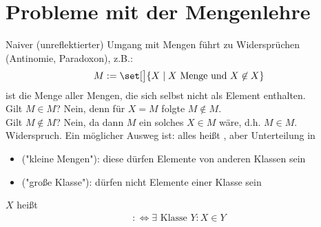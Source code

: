 \section{Probleme mit der Mengenlehre}\label{section:0.3}
Naiver (unreflektierter) Umgang mit Mengen führt zu Widersprüchen (Antinomie, Paradoxon), z.B.:
\begin{align*}
	M:=\set[\big]{X\mid X\text{ Menge und }X\not\in X}
\end{align*}
ist die Menge aller Mengen, die sich selbst nicht als Element enthalten.\\
Gilt $M\in M$?
Nein, denn für $X=M$ folgte $M\not\in M$.\\
Gilt $M\not\in M$? Nein, da dann $M$ ein solches $X\in M$ wäre, d.h. $M\in M$.
Widerspruch.\nl
Ein möglicher Ausweg ist: alles heißt , aber Unterteilung in
\begin{itemize}
	\item {} ("kleine Mengen"): diese dürfen Elemente von anderen Klassen sein
	\item {} ("große Klasse"): dürfen nicht Elemente einer Klasse sein
\end{itemize}

\begin{definition} %
	$X$ heißt 
	\begin{align*}
		:\iff\exists\text{ Klasse }Y:X\in Y
	\end{align*}
\end{definition}

